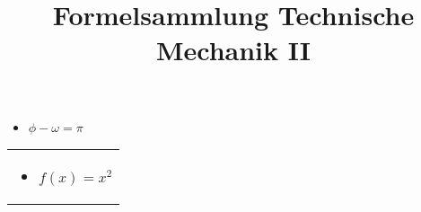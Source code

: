 \documentclass{scrartcl}
\begin{document}
	\title{Formelsammlung Technische Mechanik II}
	\date{}
	\author{}
	\maketitle
	
\begin{minipage}{0,45 \textwidth}
	\begin{itemize}
		\item $\phi - \omega = \pi$
	\end{itemize}
\end{minipage}%
\hfill
\begin{minipage}{0,45 \textwidth}
	\begin{tabular}{|p{\textwidth}}
		\begin{itemize}
			\item $f(x) = x^2$
		\end{itemize}
		
	\end{tabular}
\end{minipage}%
\end{document}
